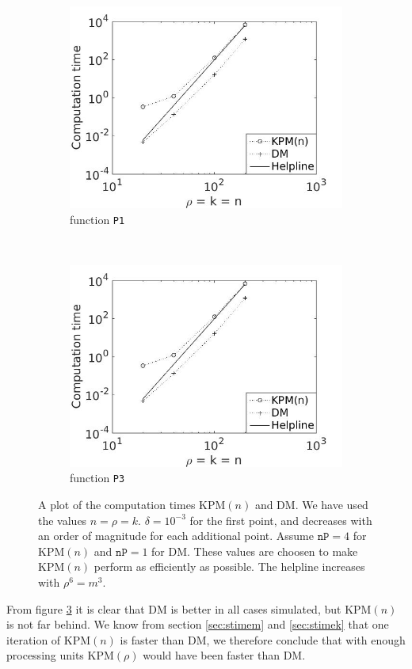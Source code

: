 \begin{figure}[H]
        \centering
        \begin{subfigure}[b]{0.45\textwidth}
                \includegraphics[width=\textwidth]{fig/comp2}
                \caption{function \texttt{P1}}
                \label{fig:c1comp1m}
        \end{subfigure}%
        ~
        \begin{subfigure}[b]{0.45\textwidth}
                \includegraphics[width=\textwidth]{fig/comp2}
                \caption{function \texttt{P3}}
                \label{fig:c2comp2m}
        \end{subfigure}
        \caption{A plot of the computation times KPM$(n)$ and DM. We have used the values $n = \rho = k$. $\delta = 10^{-3}$ for the first point, and decreases with an order of magnitude for each additional point. Assume $\texttt{nP} = 4$ for KPM$(n)$ and $\texttt{nP} = 1$ for DM. These values are choosen to make KPM$(n)$ perform as efficiently as possible. The helpline increases with $\rho^6 = m^3$.}\label{fig:comp}
\end{figure}
From figure \ref{fig:comp} it is clear that DM is better in all cases simulated, but KPM$(n)$ is not far behind. We know from section \ref{sec:stimem} and \ref{sec:stimek} that one iteration of KPM$(n)$ is faster than DM, we therefore conclude that with enough processing units KPM$(\rho)$ would have been faster than DM. \\

